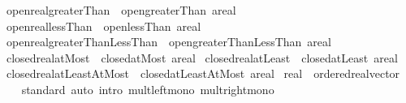 \begin{isabellebody}
\isanewline
\isanewline
{}\isamarkupfalse%
\ open{\isacharunderscore}{\kern0pt}real{\isacharunderscore}{\kern0pt}greaterThan\ {\isacharequal}{\kern0pt}\ open{\isacharunderscore}{\kern0pt}greaterThan{\isacharbrackleft}{\kern0pt}\ {\isacharprime}{\kern0pt}a{\isacharequal}{\kern0pt}real{\isacharbrackright}{\kern0pt}\isanewline
{}\isamarkupfalse%
\ open{\isacharunderscore}{\kern0pt}real{\isacharunderscore}{\kern0pt}lessThan\ {\isacharequal}{\kern0pt}\ open{\isacharunderscore}{\kern0pt}lessThan{\isacharbrackleft}{\kern0pt}\ {\isacharprime}{\kern0pt}a{\isacharequal}{\kern0pt}real{\isacharbrackright}{\kern0pt}\isanewline
{}\isamarkupfalse%
\ open{\isacharunderscore}{\kern0pt}real{\isacharunderscore}{\kern0pt}greaterThanLessThan\ {\isacharequal}{\kern0pt}\ open{\isacharunderscore}{\kern0pt}greaterThanLessThan{\isacharbrackleft}{\kern0pt}\ {\isacharprime}{\kern0pt}a{\isacharequal}{\kern0pt}real{\isacharbrackright}{\kern0pt}\isanewline
{}\isamarkupfalse%
\ closed{\isacharunderscore}{\kern0pt}real{\isacharunderscore}{\kern0pt}atMost\ {\isacharequal}{\kern0pt}\ closed{\isacharunderscore}{\kern0pt}atMost{\isacharbrackleft}{\kern0pt}\ {\isacharprime}{\kern0pt}a{\isacharequal}{\kern0pt}real{\isacharbrackright}{\kern0pt}\isanewline
{}\isamarkupfalse%
\ closed{\isacharunderscore}{\kern0pt}real{\isacharunderscore}{\kern0pt}atLeast\ {\isacharequal}{\kern0pt}\ closed{\isacharunderscore}{\kern0pt}atLeast{\isacharbrackleft}{\kern0pt}\ {\isacharprime}{\kern0pt}a{\isacharequal}{\kern0pt}real{\isacharbrackright}{\kern0pt}\isanewline
{}\isamarkupfalse%
\ closed{\isacharunderscore}{\kern0pt}real{\isacharunderscore}{\kern0pt}atLeastAtMost\ {\isacharequal}{\kern0pt}\ closed{\isacharunderscore}{\kern0pt}atLeastAtMost{\isacharbrackleft}{\kern0pt}\ {\isacharprime}{\kern0pt}a{\isacharequal}{\kern0pt}real{\isacharbrackright}{\kern0pt}\isanewline
\isanewline
{}\isamarkupfalse%
\ real\ {\isacharcolon}{\kern0pt}{\isacharcolon}{\kern0pt}\ ordered{\isacharunderscore}{\kern0pt}real{\isacharunderscore}{\kern0pt}vector\isanewline
%
\isadelimproof
\ \ %
\endisadelimproof
%
\isatagproof
{}\isamarkupfalse%
\ standard\ {\isacharparenleft}{\kern0pt}auto\ intro{\isacharcolon}{\kern0pt}\ mult{\isacharunderscore}{\kern0pt}left{\isacharunderscore}{\kern0pt}mono\ mult{\isacharunderscore}{\kern0pt}right{\isacharunderscore}{\kern0pt}mono{\isacharparenright}{\kern0pt}%
\endisatagproof

\end{isabellebody}
